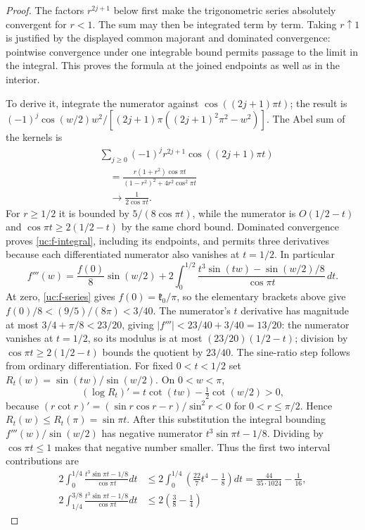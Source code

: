 \begin{proof}
The factors $r^{2j+1}$ below first make the trigonometric series
absolutely convergent for $r<1$. The sum may then be integrated term
by term. Taking $r\uparrow1$ is justified by the displayed common
majorant and dominated convergence: pointwise convergence under one
integrable bound permits passage to the limit in the integral. This
proves the formula at the joined endpoints as well as in the interior.

To derive it, integrate the numerator against $\cos((2j+1)\pi t)$;
the result is
$(-1)^j\cos(w/2)w^2/[(2j+1)\pi((2j+1)^2\pi^2-w^2)]$.
The Abel sum of the kernels is
\[
 \begin{aligned}
 &\sum_{j\geq0}(-1)^jr^{2j+1}\cos((2j+1)\pi t)\\
 &\quad=\frac{r(1+r^2)\cos\pi t}{(1-r^2)^2+4r^2\cos^2\pi t}\\
 &\quad\longrightarrow\frac1{2\cos\pi t}.
 \end{aligned}
\]
For $r\geq1/2$ it is bounded by $5/(8\cos\pi t)$, while the
numerator is $O(1/2-t)$ and $\cos\pi t\geq2(1/2-t)$ by the same chord bound.
Dominated convergence proves \eqref{uc:f-integral}, including its
endpoints, and permits three derivatives because each differentiated
numerator also vanishes at $t=1/2$. In particular
\[
 f'''(w)=\frac{f(0)}8\sin(w/2)
 +2\int_0^{1/2}\frac{t^3\sin(tw)-\sin(w/2)/8}{\cos\pi t}\,dt.
\]
At zero, \eqref{uc:f-series} gives
$f(0)=\mathfrak k_0/\pi$, so the elementary brackets above give
$f(0)/8<(9/5)/(8\pi)<3/40$.
The numerator's $t$ derivative has magnitude at most
$3/4+\pi/8<23/20$, giving $|f'''|<23/40+3/40=13/20$: the numerator vanishes at $t=1/2$,
so its modulus is at most $(23/20)(1/2-t)$; division by
$\cos\pi t\geq2(1/2-t)$ bounds the quotient by $23/40$.
The sine-ratio step follows from ordinary differentiation. For fixed
$0<t<1/2$ set $R_t(w)=\sin(tw)/\sin(w/2)$. On $0<w<\pi$,
\[
 (\log R_t)'=t\cot(tw)-\tfrac12\cot(w/2)>0,
\]
because $(r\cot r)'=(\sin r\cos r-r)/\sin^2r<0$ for
$0<r\leq\pi/2$. Hence $R_t(w)\leq R_t(\pi)=\sin\pi t$.
After this substitution the integral bounding
$f'''(w)/\sin(w/2)$ has negative numerator
$t^3\sin\pi t-1/8$. Dividing by $\cos\pi t\leq1$ makes that
negative number smaller. Thus the first two interval contributions are
\[
 \begin{aligned}
 2\int_0^{1/4}\frac{t^3\sin\pi t-1/8}{\cos\pi t}dt
 &\leq2\int_0^{1/4}\left(\frac{22}{7}t^4-\frac18\right)dt
 =\frac{44}{35\cdot1024}-\frac1{16},\\
 2\int_{1/4}^{3/8}\frac{t^3\sin\pi t-1/8}{\cos\pi t}dt
 &\leq2\left(\frac38-\frac14\right)

\end{aligned}\]
\end{proof}

